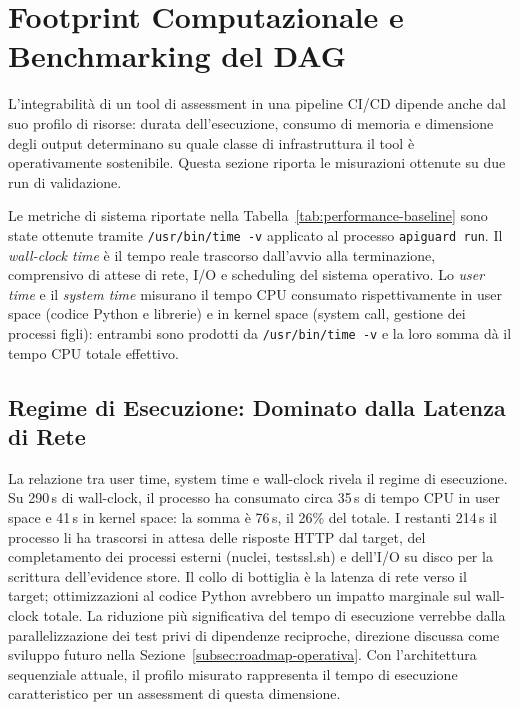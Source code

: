\section{Footprint Computazionale e Benchmarking del DAG}%
\label{sec:footprint-dag}

L'integrabilità di un tool di assessment in una pipeline \gls{CI/CD} dipende anche dal suo profilo di risorse: durata dell'esecuzione, consumo di memoria e dimensione degli output determinano su quale classe di infrastruttura il tool è operativamente sostenibile. Questa sezione riporta le misurazioni ottenute su due run di validazione.

Le metriche di sistema riportate nella Tabella~\ref{tab:performance-baseline} sono state ottenute tramite \texttt{/usr/bin/time -v} applicato al processo \texttt{apiguard run}. Il \emph{wall-clock time} è il tempo reale trascorso dall'avvio alla terminazione, comprensivo di attese di rete, I/O e scheduling del sistema operativo. Lo \emph{user time} e il \emph{system time} misurano il tempo CPU consumato rispettivamente in user space (codice Python e librerie) e in kernel space (system call, gestione dei processi figli): entrambi sono prodotti da \texttt{/usr/bin/time -v} e la loro somma dà il tempo CPU totale effettivo.




\subsection{Regime di Esecuzione: Dominato dalla Latenza di Rete}\label{subsec:regime-esecuzione}

La relazione tra user time, system time e wall-clock rivela il regime di esecuzione. Su 290\,s di wall-clock, il processo ha consumato circa 35\,s di tempo CPU in user space e 41\,s in kernel space: la somma è 76\,s, il 26\% del totale. I restanti 214\,s il processo li ha trascorsi in attesa delle risposte \gls{HTTP} dal target, del completamento dei processi esterni (nuclei, testssl.sh) e dell'I/O su disco per la scrittura dell'evidence store. Il collo di bottiglia è la latenza di rete verso il target; ottimizzazioni al codice Python avrebbero un impatto marginale sul wall-clock totale. La riduzione più significativa del tempo di esecuzione verrebbe dalla parallelizzazione dei test privi di dipendenze reciproche, direzione discussa come sviluppo futuro nella Sezione~\ref{subsec:roadmap-operativa}. Con l'architettura sequenziale attuale, il profilo misurato rappresenta il tempo di esecuzione caratteristico per un assessment di questa dimensione.


